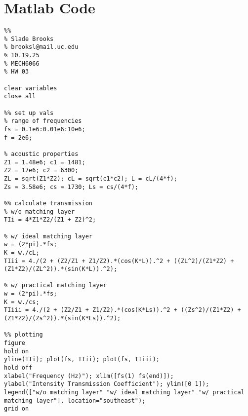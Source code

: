 \documentclass[12 pt]{article}
\begin{document}
\section*{Matlab Code}
\begin{verbatim}
%%
% Slade Brooks
% brooksl@mail.uc.edu
% 10.19.25
% MECH6066
% HW 03

clear variables
close all

%% set up vals
% range of frequencies
fs = 0.1e6:0.01e6:10e6;
f = 2e6;

% acoustic properties
Z1 = 1.48e6; c1 = 1481;
Z2 = 17e6; c2 = 6300;
ZL = sqrt(Z1*Z2); cL = sqrt(c1*c2); L = cL/(4*f);
Zs = 3.58e6; cs = 1730; Ls = cs/(4*f);

%% calculate transmission
% w/o matching layer
TIi = 4*Z1*Z2/(Z1 + Z2)^2;

% w/ ideal matching layer
w = (2*pi).*fs;
K = w./cL;
TIii = 4./(2 + (Z2/Z1 + Z1/Z2).*(cos(K*L)).^2 + ((ZL^2)/(Z1*Z2) + (Z1*Z2)/(ZL^2)).*(sin(K*L)).^2);

% w/ practical matching layer
w = (2*pi).*fs;
K = w./cs;
TIiii = 4./(2 + (Z2/Z1 + Z1/Z2).*(cos(K*Ls)).^2 + ((Zs^2)/(Z1*Z2) + (Z1*Z2)/(Zs^2)).*(sin(K*Ls)).^2);

%% plotting
figure
hold on
yline(TIi); plot(fs, TIii); plot(fs, TIiii);
hold off
xlabel("Frequency (Hz)"); xlim([fs(1) fs(end)]);
ylabel("Intensity Transmission Coefficient"); ylim([0 1]);
legend(["w/o matching layer" "w/ ideal matching layer" "w/ practical matching layer"], location="southeast");
grid on
\end{verbatim}



\end{document}
